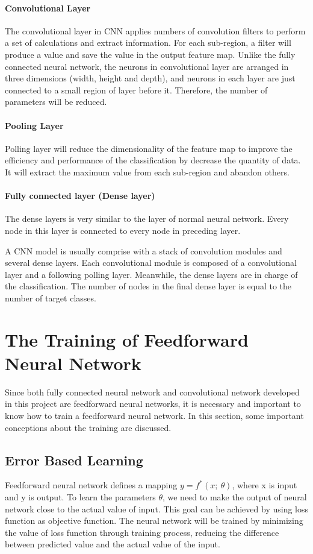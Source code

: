 \documentclass[]{UCD_CS_FYP_Report}
\begin{document}
\paragraph{Convolutional Layer}
The convolutional layer in CNN applies numbers of convolution filters to perform a set of calculations and extract information. For each sub-region, a filter will produce a value and save the value in the output feature map. Unlike the fully connected neural network, the neurons in convolutional layer are arranged in three dimensions (width, height and depth), and neurons in each layer are just connected to a small region of layer before it. Therefore, the number of parameters will be reduced.
\paragraph{Pooling Layer}
Polling layer will reduce the dimensionality of the feature map to improve the efficiency and performance of the classification by decrease the quantity of data. It will extract the maximum value from each sub-region and abandon others.
\paragraph{Fully connected layer (Dense layer)}
The dense layers is very similar to the layer of normal neural network. Every node in this layer is connected to every node in preceding layer.

A CNN model is usually comprise with a stack of convolution modules and several dense layers. Each convolutional module is composed of a convolutional layer and a following polling layer. Meanwhile, the dense layers are in charge of the classification. The number of nodes in the final dense layer is equal to the number of target classes.
\section{The Training of Feedforward Neural Network}
Since both fully connected neural network and convolutional network developed in this project are feedforward neural networks, it is necessary and important to know how to train a feedforward neural network. In this section, some important conceptions about the training are discussed.
\subsection{Error Based Learning}
Feedforward neural network defines a mapping $y=f^*(x;\ \theta{})$, where x is input and y is output. To learn the parameters $\theta{}$, we need to make the output of neural network close to the actual value of input. This goal can be achieved by using loss function as objective function. The neural network will be trained by minimizing the value of loss function through training process, reducing the difference between predicted value and the actual value of the input.
\end{document}
